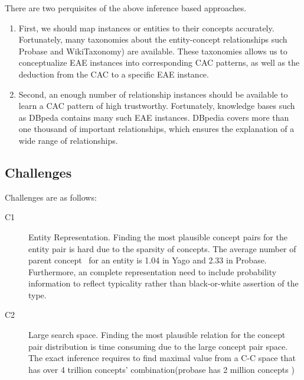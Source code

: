 There are two perquisites of the above inference based approaches.
\begin{enumerate}
\item First, we should map instances or entities to their concepts accurately. Fortunately, many taxonomies about the entity-concept relationships such \ac{Probase} and \ac{WikiTaxonomy}) are available. These taxonomies allows us to conceptualize EAE instances into corresponding CAC patterns, as well as the deduction from the CAC to a specific EAE instance.
\item Second, an enough number of relationship instances should be available to learn a CAC pattern of high trustworthy. Fortunately, knowledge bases such as \ac{DBpeda} contains many such EAE instances. DBpedia covers more than one thousand of important relationships, which ensures the explanation of a wide range of relationships.
\end{enumerate}


\subsection{Challenges}
Challenges are as follows:
\begin{description}
  \item[C1] Entity Representation.
  Finding the most plausible concept pairs for the entity pair is hard due to the sparsity of concepts.
  The average number of parent concept~\cite{wu2012probase} for an entity is 1.04 in Yago and 2.33 in Probase.
  Furthermore, an complete representation need to include probability information to reflect typicality rather than black-or-white assertion of the type.
  \item[C2] Large search space.
  Finding the most plausible relation for the concept pair distribution is time consuming due to the large concept pair space.
  The exact inference requires to find maximal value from a C-C space that has over 4 trillion concepts' combination(probase has 2 million concepts )
\end{description}



